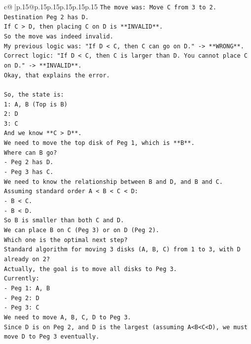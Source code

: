 \documentclass{article}
\begin{document}
{\begin{supertabular}{c@{$\;$}|p{.15\linewidth}@{}p{.15\linewidth}p{.15\linewidth}p{.15\linewidth}p{.15\linewidth}p{.15\linewidth}}
{{{\texttt{The move was: Move C from 3 to 2.} \\
\texttt{Destination Peg 2 has D.} \\
\texttt{If C > D, then placing C on D is **INVALID**.} \\
\texttt{So the move was indeed invalid.} \\
\texttt{My previous logic was: "If D < C, then C can go on D." {-}> **WRONG**.} \\
\texttt{Correct logic: "If D < C, then C is larger than D. You cannot place C on D." {-}> **INVALID**.} \\
\texttt{Okay, that explains the error.} \\
\\ 
\texttt{So, the state is:} \\
\texttt{1: A, B (Top is B)} \\
\texttt{2: D} \\
\texttt{3: C} \\
\texttt{And we know **C > D**.} \\
\texttt{We need to move the top disk of Peg 1, which is **B**.} \\
\texttt{Where can B go?} \\
\texttt{{-} Peg 2 has D.} \\
\texttt{{-} Peg 3 has C.} \\
\texttt{We need to know the relationship between B and D, and B and C.} \\
\texttt{Assuming standard order A < B < C < D:} \\
\texttt{{-} B < C.} \\
\texttt{{-} B < D.} \\
\texttt{So B is smaller than both C and D.} \\
\texttt{We can place B on C (Peg 3) or on D (Peg 2).} \\
\texttt{Which one is the optimal next step?} \\
\texttt{Standard algorithm for moving 3 disks (A, B, C) from 1 to 3, with D already on 2?} \\
\texttt{Actually, the goal is to move all disks to Peg 3.} \\
\texttt{Currently:} \\
\texttt{{-} Peg 1: A, B} \\
\texttt{{-} Peg 2: D} \\
\texttt{{-} Peg 3: C} \\
\texttt{We need to move A, B, C, D to Peg 3.} \\
\texttt{Since D is on Peg 2, and D is the largest (assuming A<B<C<D), we must move D to Peg 3 eventually.} \\
}}}
\end{supertabular}}
\end{document}
